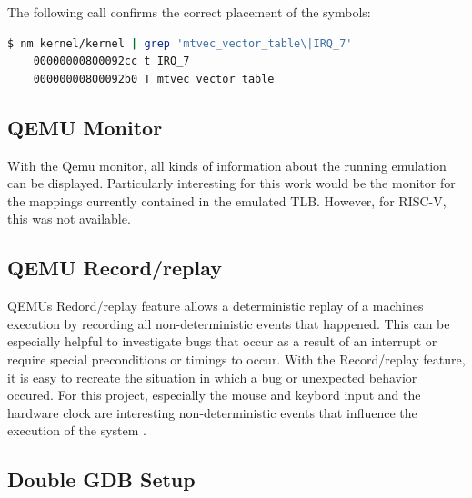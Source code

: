 The following call confirms the correct placement of the symbols:

\begin{lstlisting}[language={sh}]
    $ nm kernel/kernel | grep 'mtvec_vector_table\|IRQ_7'
    00000000800092cc t IRQ_7
    00000000800092b0 T mtvec_vector_table
\end{lstlisting}


\subsection{QEMU Monitor}
With the Qemu monitor, all kinds of information about the running emulation can be displayed. Particularly interesting for this work would be the monitor for the mappings currently contained in the emulated TLB. However, for RISC-V, this was not available.



\subsection{QEMU Record/replay}
QEMUs Redord/replay feature allows a deterministic replay of a machines execution by recording
all non-deterministic events that happened. This can be especially helpful to investigate bugs
that occur as a result of an interrupt or require special preconditions or timings to occur.
With the Record/replay feature, it is easy to recreate the situation in which a bug or unexpected
behavior occured.
For this project, especially the mouse and keybord input and the hardware clock are interesting
non-deterministic events that influence the execution of the system \cite{RecordReplayQEMU}.

\subsection{Double GDB Setup}






